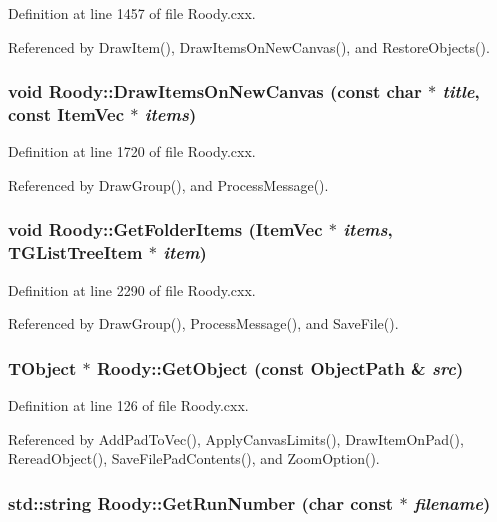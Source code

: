 Definition at line 1457 of file Roody.cxx.

Referenced by DrawItem(), DrawItemsOnNewCanvas(), and RestoreObjects().
\subsubsection[{DrawItemsOnNewCanvas}]{\setlength{\rightskip}{0pt plus 5cm}void Roody::DrawItemsOnNewCanvas (const char $\ast$ {\em title}, \/  const {\bf ItemVec} $\ast$ {\em items})\hspace{0.3cm}{\ttfamily  [private]}}\label{classRoody_aa9e2fcdc014ff538adbd88a7c7b36aab}


Definition at line 1720 of file Roody.cxx.

Referenced by DrawGroup(), and ProcessMessage().
\subsubsection[{GetFolderItems}]{\setlength{\rightskip}{0pt plus 5cm}void Roody::GetFolderItems ({\bf ItemVec} $\ast$ {\em items}, \/  TGListTreeItem $\ast$ {\em item})\hspace{0.3cm}{\ttfamily  [private]}}\label{classRoody_a00d2db71af5293a022103604a721e72e}


Definition at line 2290 of file Roody.cxx.

Referenced by DrawGroup(), ProcessMessage(), and SaveFile().
\subsubsection[{GetObject}]{\setlength{\rightskip}{0pt plus 5cm}TObject $\ast$ Roody::GetObject (const ObjectPath \& {\em src})}\label{classRoody_a9f953fb62838af838861de46e2c3ec4d}


Definition at line 126 of file Roody.cxx.

Referenced by AddPadToVec(), ApplyCanvasLimits(), DrawItemOnPad(), RereadObject(), SaveFilePadContents(), and ZoomOption().
\subsubsection[{GetRunNumber}]{\setlength{\rightskip}{0pt plus 5cm}std::string Roody::GetRunNumber (char const $\ast$ {\em filename})\hspace{0.3cm}{\ttfamily  [private]}}\label{classRoody_a881ecc84f680a6b25e9e81cf9b3c75bc}


